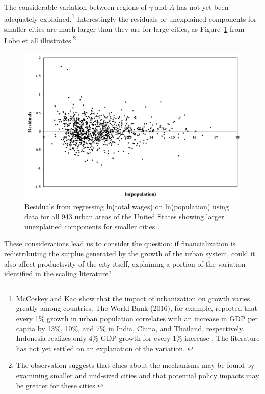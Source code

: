 The considerable variation between regions of $\gamma$ and $A$ \cite{mccoskeyPanelDataInvestigation1999, haryantoRelationshipUrbanizationEducation2021, pugaMagnitudeCausesAgglomeration2010, loboUrbanScalingProduction2013} has not yet been adequately explained.\footnote{McCoskey and Kao \cite{mccoskeyPanelDataInvestigation1999} show that the impact of urbanization on growth varies greatly among countries. The World Bank (2016), for example, reported that every 1\% growth in urban population correlates with an increase in GDP per capita by 13\%, 10\%, and 7\% in India, China, and Thailand, respectively. Indonesia realizes only 4\% GDP growth for every 1\% increase \cite{haryantoRelationshipUrbanizationEducation2021}.  The literature has not yet settled on an explanation of the variation.  \cite{loboUrbanScalingProduction2013, pugaMagnitudeCausesAgglomeration2010}} 
Interestingly the residuals or unexplained components for smaller cities are much larger than they are for large cities, as Figure~\ref{fig-residuals-lobo} from Lobo et all \cite{loboUrbanScalingProduction2013} illustrates.\footnote{The observation suggests that clues about the mechanisms may be found by examining smaller and mid-sized cities and that potential policy impacts may be greater for these cities.} 
\begin{figure}[h!tb]
\centering
\includegraphics[scale=0.40]{fig/residuals-lobo.png}
\caption[Residuals from regressing ln(total wages) on ln(population)]{Residuals from regressing ln(total wages) on ln(population) using data for all 943 urban areas of the United States showing larger unexplained components for smaller cities  \cite{loboUrbanScalingProduction2013}.}\label{fig-residuals-lobo}
\end{figure} 
These considerations lead us to consider the question: if financialization is redistributing the surplus generated by the growth of the urban system, could it also affect  productivity of the city itself, explaining a portion of the variation identified in the scaling literature? 




